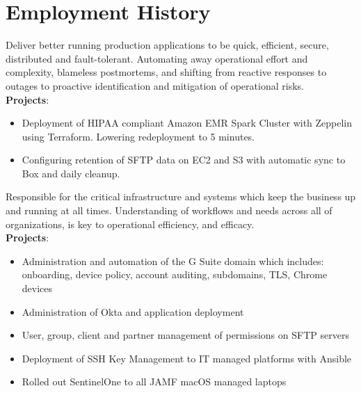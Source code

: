 \documentclass[letter,sans]{moderncv}
\begin{document}
\maketitle

\vspace{-0.6in}

\section{Employment History}

{Deliver better running production applications to be quick, efficient, secure, distributed and fault-tolerant. Automating away operational effort and complexity, blameless postmortems, and shifting from reactive responses to outages to proactive identification and mitigation of operational risks.\\
  \textbf{Projects}:
  \begin{itemize}
  \item Deployment of HIPAA compliant Amazon EMR Spark Cluster with Zeppelin using Terraform. Lowering redeployment to 5 minutes.
  \item Configuring retention of SFTP data on EC2 and S3 with automatic sync to Box and daily cleanup.
  \end{itemize}
}

{Responsible for the critical infrastructure and systems which keep the business up and running at all times. Understanding of workflows and needs across all of organizations, is key to operational efficiency, and efficacy.\\
  \textbf{Projects}:
  \begin{itemize}
  \item Administration and automation of the G Suite domain which includes: onboarding, device policy, account auditing, subdomains, TLS, Chrome devices
  \item Administration of Okta and application deployment
  \item User, group, client and partner management of permissions on SFTP servers
  \item Deployment of SSH Key Management to IT managed platforms with Ansible
  \item Rolled out SentinelOne to all JAMF macOS managed laptops
  \end{itemize}
}
\end{document}
